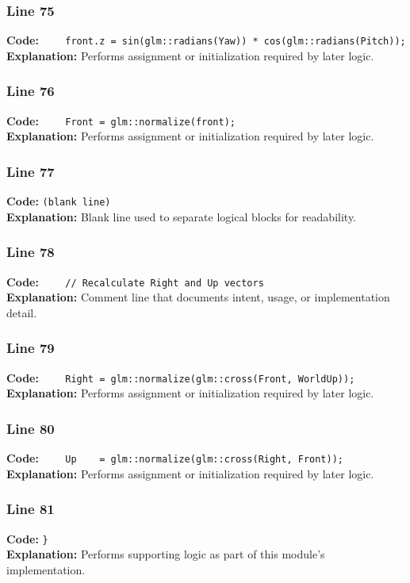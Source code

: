 \documentclass[11pt,a4paper]{article}
\begin{document}
\subsubsection*{Line 75}
\textbf{Code:} \verb|    front.z = sin(glm::radians(Yaw)) * cos(glm::radians(Pitch));|\\
\textbf{Explanation:} Performs assignment or initialization required by later logic.

\subsubsection*{Line 76}
\textbf{Code:} \verb|    Front = glm::normalize(front);|\\
\textbf{Explanation:} Performs assignment or initialization required by later logic.

\subsubsection*{Line 77}
\textbf{Code:} \texttt{(blank line)}\\
\textbf{Explanation:} Blank line used to separate logical blocks for readability.

\subsubsection*{Line 78}
\textbf{Code:} \verb|    // Recalculate Right and Up vectors|\\
\textbf{Explanation:} Comment line that documents intent, usage, or implementation detail.

\subsubsection*{Line 79}
\textbf{Code:} \verb|    Right = glm::normalize(glm::cross(Front, WorldUp));|\\
\textbf{Explanation:} Performs assignment or initialization required by later logic.

\subsubsection*{Line 80}
\textbf{Code:} \verb|    Up    = glm::normalize(glm::cross(Right, Front));|\\
\textbf{Explanation:} Performs assignment or initialization required by later logic.

\subsubsection*{Line 81}
\textbf{Code:} \verb|}|\\
\textbf{Explanation:} Performs supporting logic as part of this module's implementation.
\end{document}
